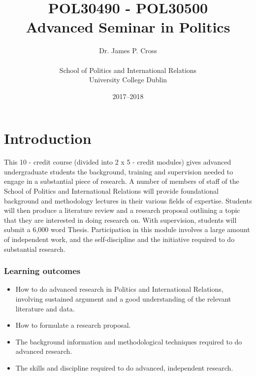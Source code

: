 \documentclass[a4paper,12pt]{article}
\begin{document}
\title{POL30490 - POL30500 \\Advanced Seminar in Politics}

\author{Dr. James P. Cross\\\\School of Politics and International Relations\\University College Dublin}

\date{2017--2018}

\maketitle

\section*{Introduction}

	This 10 - credit course (divided into 2 x 5 - credit modules) gives advanced undergraduate students the background, training and supervision needed to engage in a substantial piece of research. A number of members of staff of the School of Politics and International Relations will provide foundational background and methodology lectures in their various fields of expertise. Students will then produce a literature review and a research proposal outlining a topic that they are interested in doing research on. With supervision, students will submit a 6,000 word Thesis. Participation in this module involves a large amount of independent work, and the self-discipline and the initiative required to do substantial research.

\subsubsection*{Learning outcomes}

\begin{itemize}
  \item How to do advanced research in Politics and International Relations, involving sustained argument and a good understanding of the relevant literature and data.
  \item How to formulate a research proposal.
  \item The background information and methodological techniques required to do advanced research.
  \item The skills and discipline required to do advanced, independent research.
\end{itemize}
\end{document}
